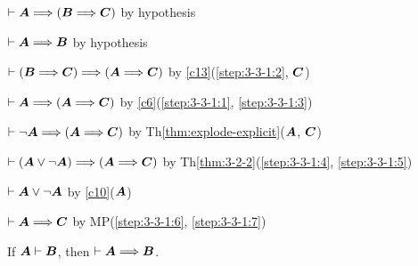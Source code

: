 \begin{pf}
\item\label{step:3-3-1:1}\Pf $\vdash\boldsymbol{A}\Longrightarrow(\boldsymbol{B}\Longrightarrow\boldsymbol{C})$
  by hypothesis
\item\label{step:3-3-1:2} $\vdash\boldsymbol{A}\Longrightarrow\boldsymbol{B}$
  by hypothesis
\item\label{step:3-3-1:3} $\vdash(\boldsymbol{B}\Longrightarrow\boldsymbol{C})\Longrightarrow(\boldsymbol{A}\Longrightarrow\boldsymbol{C})$
  by \ref{c13}(\ref{step:3-3-1:2}, $\boldsymbol{C}$)
\item\label{step:3-3-1:4} $\vdash\boldsymbol{A}\Longrightarrow(\boldsymbol{A}\Longrightarrow\boldsymbol{C})$
  by \ref{c6}(\ref{step:3-3-1:1}, \ref{step:3-3-1:3})
\item\label{step:3-3-1:5} $\vdash\neg\boldsymbol{A}\Longrightarrow(\boldsymbol{A}\Longrightarrow\boldsymbol{C})$
  by Th\ref{thm:explode-explicit}($\boldsymbol{A}$, $\boldsymbol{C}$)
\item\label{step:3-3-1:6} $\vdash(\boldsymbol{A}\lor\neg\boldsymbol{A})\Longrightarrow(\boldsymbol{A}\Longrightarrow\boldsymbol{C})$
  by Th\ref{thm:3-2-2}(\ref{step:3-3-1:4}, \ref{step:3-3-1:5})
\item\label{step:3-3-1:7} $\vdash\boldsymbol{A}\lor\neg\boldsymbol{A}$
  by \ref{c10}($\boldsymbol{A}$)
\item\label{step:3-3-1:8} $\vdash\boldsymbol{A}\Longrightarrow\boldsymbol{C}$
  by MP(\ref{step:3-3-1:6}, \ref{step:3-3-1:7})
\end{pf}

\begin{dc}\label{c14}%
If $\boldsymbol{A}\vdash\boldsymbol{B}$, then $\vdash\boldsymbol{A}\Longrightarrow\boldsymbol{B}$.
\end{dc}

